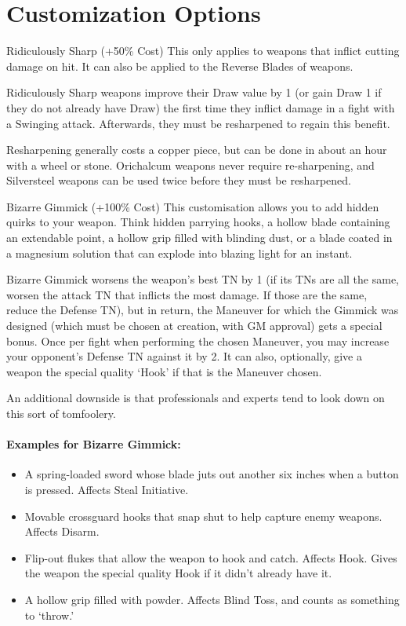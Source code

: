 \documentclass[oneside,11pt,english]{book}
\begin{document}
\section{Customization Options}
Ridiculously Sharp (+50\% Cost)
This only applies to weapons that inflict cutting damage on hit. It can also be applied to the Reverse Blades of weapons.

Ridiculously Sharp weapons improve their Draw value by 1 (or gain Draw 1 if they do not already have Draw) the first time they inflict damage in a fight with a Swinging attack. Afterwards, they must be resharpened to regain this benefit.

Resharpening generally costs a copper piece, but can be done in about an hour with a wheel or stone. Orichalcum weapons never require re-sharpening, and Silversteel weapons can be used twice before they must be resharpened.

Bizarre Gimmick (+100\% Cost)
This customisation allows you to add hidden quirks to your weapon. Think hidden parrying hooks, a hollow blade containing an extendable point, a hollow grip filled with blinding dust, or a blade coated in a magnesium solution that can explode into blazing light for an instant.

Bizarre Gimmick worsens the weapon’s best TN by 1 (if its TNs are all the same, worsen the attack TN that inflicts the most damage. If those are the same, reduce the Defense TN), but in return, the Maneuver for which the Gimmick was designed (which must be chosen at creation, with GM approval) gets a special bonus. Once per fight when performing the chosen Maneuver, you may increase your opponent’s Defense TN against it by 2. It can also, optionally, give a weapon the special quality ‘Hook’ if that is the Maneuver chosen.

An additional downside is that professionals and experts tend to look down on this sort of tomfoolery.
\paragraph{Examples for Bizarre Gimmick:}
\begin{itemize}
	\item A spring-loaded sword whose blade juts out another six inches when a button is pressed. Affects Steal Initiative.
	\item Movable crossguard hooks that snap shut to help capture enemy weapons. Affects Disarm.
	\item Flip-out flukes that allow the weapon to hook and catch. Affects Hook. Gives the weapon the special quality Hook if it didn’t already have it.
	\item A hollow grip filled with powder. Affects Blind Toss, and counts as something to ‘throw.’
\end{itemize}
\end{document}
